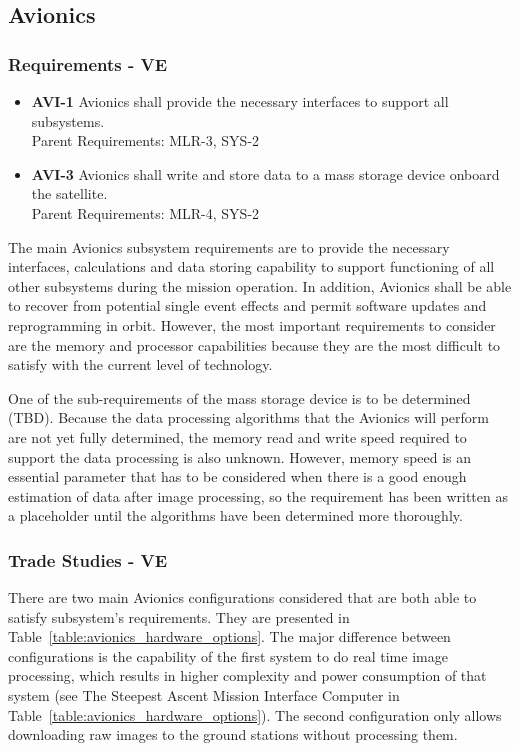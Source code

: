 \documentclass[12pt]{article}
\begin{document}
\subsection{Avionics}

\subsubsection{Requirements - VE}
\begin{itemize}
\item \textbf{AVI-1} Avionics shall provide the necessary interfaces to support all subsystems.\\
Parent Requirements: MLR-3, SYS-2
\item \textbf{AVI-3} Avionics shall write and store data to a mass storage device onboard the satellite.\\
Parent Requirements: MLR-4, SYS-2
\end{itemize}
The main Avionics subsystem requirements are to provide the necessary interfaces, calculations and data storing capability to support functioning of all other subsystems during the mission operation.  In addition, Avionics shall be able to recover from potential single event effects and permit software updates and reprogramming in orbit.
However, the most important requirements to consider are the memory and processor capabilities because they are the most difficult to satisfy with the current level of technology.

One of the sub-requirements of the mass storage device is to be determined (TBD).  Because the data processing algorithms that the Avionics will perform are not yet fully determined, the memory read and write speed required to support the data processing is also unknown.  However, memory speed is an essential parameter that has to be considered when there is a good enough estimation of data after image processing, so the requirement has been written as a placeholder until the algorithms have been determined more thoroughly.

			\subsubsection{Trade Studies - VE}
There are two main Avionics configurations considered that are both able to satisfy subsystem’s requirements. They are presented in Table~\ref{table:avionics_hardware_options}. The major difference between configurations is the capability of the first system to do real time image processing, which results in higher complexity and power consumption of that system (see The Steepest Ascent Mission Interface Computer in Table~\ref{table:avionics_hardware_options}). The second configuration only allows downloading raw images to the ground stations without processing them.
\end{document}
